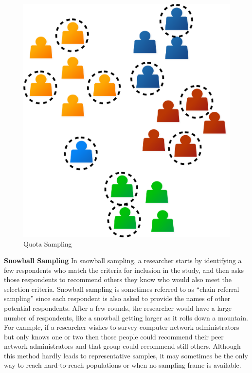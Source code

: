 \begin{figure}[H]
	\centering
	\includegraphics[width=\maxwidth{.35\linewidth}]{gfx/07-08}
	\caption{Quota Sampling}
	\label{07:fig08}
\end{figure}

\textbf{Snowball Sampling} In snowball sampling, a researcher starts by identifying a few respondents who match the criteria for inclusion in the study, and then asks those respondents to recommend others they know who would also meet the selection criteria. Snowball sampling is sometimes referred to as ``chain referral sampling'' since each respondent is also asked to provide the names of other potential respondents. After a few rounds, the researcher would have a large number of respondents, like a snowball getting larger as it rolls down a mountain. For example, if a researcher wishes to survey computer network administrators but only knows one or two then those people could recommend their peer network administrators and that group could recommend still others. Although this method hardly leads to representative samples, it may sometimes be the only way to reach hard-to-reach populations or when no sampling frame is available.

